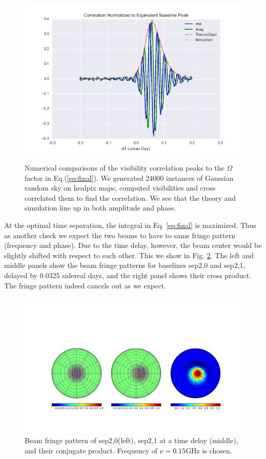 \documentclass[preprint2,numberedappendix,tighten,twocolappendix]{aastex6}  %
\renewcommand\[{\begin{equation}}
\renewcommand\]{\end{equation}}
\begin{document}
\begin{figure}[H]
\includegraphics[width=\linewidth]{redun_agree}
\label{fig:numerics}
\caption{Numerical comparisons of the visibility correlation peaks to the $\Omega$ factor in Eq.(\ref{eq:final}). We generated 24000 instances of Gaussian random sky on healpix maps, computed visibilities and cross correlated them to find the correlation.  We see that the theory and simulation line up in both amplitude and phase. }
\end{figure}


At the optimal time separation, the integral in Eq. \eqref{eq:final}
is maximized. Thus as another check we expect the two beams to have to same fringe pattern
(frequency and phase). Due to the time delay, however, the beam center
would be slightly shifted with respect to each other. This we show
in Fig. \ref{fig:Beam-fringe-pattern}. The left and middle panels show the beam fringe
patterns for baselines sep2,0 and sep2,1, delayed by 0.0325 sidereal days,
and the right panel shows their cross product. The fringe pattern
indeed cancels out as we expect. 

\begin{widetext}
\begin{figure}[H]
\includegraphics[scale=0.5]{fringe_res}

\caption{Beam fringe pattern of sep2,0(left), sep2,1 at a time delay (middle),
and their conjugate product. Frequency of $\nu=0.15\text{GHz}$ is
chosen. \label{fig:Beam-fringe-pattern}}
\end{figure}
\end{widetext}
\end{document}
